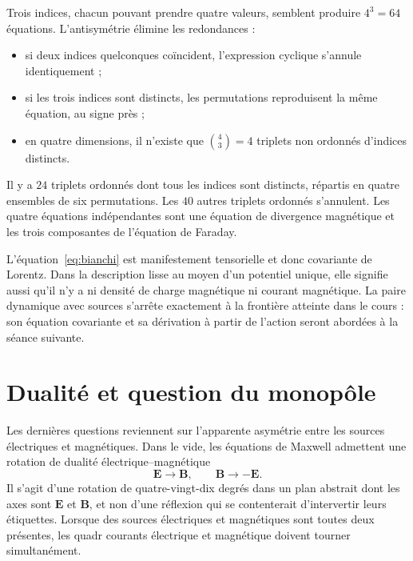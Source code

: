 Trois indices, chacun pouvant prendre quatre valeurs, semblent produire \(4^3=64\) équations. L’antisymétrie élimine les redondances :
\begin{itemize}
\item si deux indices quelconques coïncident, l’expression cyclique s’annule identiquement ;
\item si les trois indices sont distincts, les permutations reproduisent la même équation, au signe près ;
\item en quatre dimensions, il n’existe que \(\binom{4}{3}=4\) triplets non ordonnés d’indices distincts.
\end{itemize}
Il y a \(24\) triplets ordonnés dont tous les indices sont distincts, répartis en quatre ensembles de six permutations. Les \(40\) autres triplets ordonnés s’annulent. Les quatre équations indépendantes sont une équation de divergence magnétique et les trois composantes de l’équation de Faraday.

\begin{classroomqa}
\end{classroomqa}

L’équation~\eqref{eq:bianchi} est manifestement tensorielle et donc covariante de Lorentz. Dans la description lisse au moyen d’un potentiel unique, elle signifie aussi qu’il n’y a ni densité de charge magnétique ni courant magnétique. La paire dynamique avec sources s’arrête exactement à la frontière atteinte dans le cours : son équation covariante et sa dérivation à partir de l’action seront abordées à la séance suivante.

\section{Dualité et question du monopôle}

Les dernières questions reviennent sur l’apparente asymétrie entre les sources électriques et magnétiques. Dans le vide, les équations de Maxwell admettent une rotation de dualité électrique--magnétique
\begin{equation}
\mathbf E\longrightarrow\mathbf B,
\qquad
\mathbf B\longrightarrow-\mathbf E.
\label{eq:duality-quarter-turn}
\end{equation}
Il s’agit d’une rotation de quatre-vingt-dix degrés dans un plan abstrait dont les axes sont \(\mathbf E\) et \(\mathbf B\), et non d’une réflexion qui se contenterait d’intervertir leurs étiquettes. Lorsque des sources électriques et magnétiques sont toutes deux présentes, les quadr courants électrique et magnétique doivent tourner simultanément.

